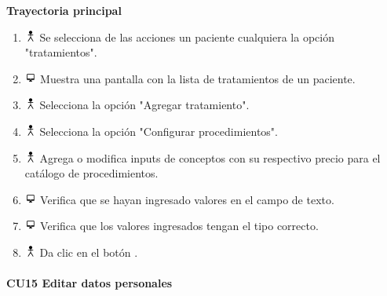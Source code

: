 \textbf{Trayectoria principal}
\begin{enumerate}
\item \includegraphics[height=1em]{pictures/actor.png} Se selecciona de las acciones un paciente cualquiera la opción "tratamientos".
\item \includegraphics[height=1em]{pictures/sistema.png} Muestra una pantalla con la lista de tratamientos de un paciente.
\item \includegraphics[height=1em]{pictures/actor.png} Selecciona la opción "Agregar tratamiento".
\item \includegraphics[height=1em]{pictures/actor.png} Selecciona la opción "Configurar procedimientos".
\item \includegraphics[height=1em]{pictures/actor.png} Agrega o modifica inputs de conceptos con su respectivo precio para el catálogo de procedimientos.
\item \includegraphics[height=1em]{pictures/sistema.png} Verifica que se hayan ingresado valores en el campo de texto.
\item \includegraphics[height=1em]{pictures/sistema.png} Verifica que los valores ingresados tengan el tipo correcto.
\item \includegraphics[height=1em]{pictures/actor.png} Da clic en el botón .
\end{enumerate} \bigskip


\paragraph{CU15 Editar datos personales}

